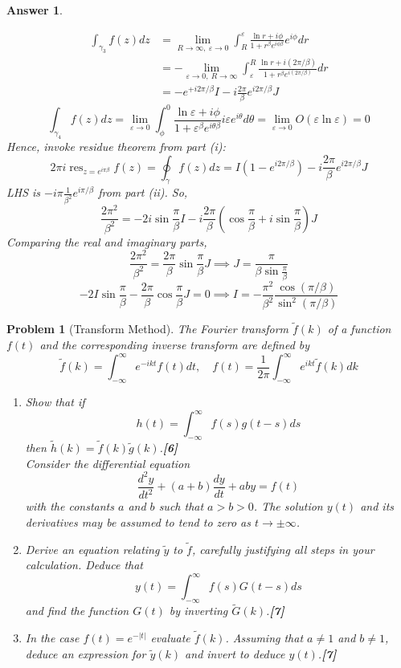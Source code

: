 \documentclass[a4paper]{article}
\DeclareMathOperator{\res}{res}
\newtheorem{ans}{Answer}[section]
\theoremstyle{new}
\newtheorem{qns}{Problem}[section]
\begin{document}
\begin{ans}
\begin{enumerate}[label=(\roman*)]
\begin{align}
\int_{\gamma_3}f(z)dz&=\lim_{R\rightarrow\infty,~\varepsilon\rightarrow 0}\int_R^\varepsilon\frac{\ln r+i\phi}{1+r^\beta e^{i\phi\beta}}e^{i\phi}dr\nonumber\\&=-\lim_{\varepsilon\rightarrow 0,~R\rightarrow\infty}\int_{\varepsilon}^R\frac{\ln r+i(2\pi/\beta)}{1+r^\beta e^{i(2\pi/\beta)}}dr\nonumber\\&=-e^{+i2\pi/\beta}I-i\frac{2\pi}{\beta}e^{i2\pi/\beta}J\nonumber
\end{align}
$$\int_{\gamma_4}f(z)dz=\lim_{\varepsilon\rightarrow 0}\int_\phi^0\frac{\ln\varepsilon+i\phi}{1+\varepsilon^\beta e^{i\theta\beta}}i\varepsilon e^{i\theta}d\theta=\lim_{\varepsilon\rightarrow 0}O(\varepsilon\ln\varepsilon)=0$$
Hence, invoke residue theorem from part (i):
$$2\pi i\res_{z=e^{i\pi\beta}}f(z)=\oint_\gamma f(z)dz=I(1-e^{i2\pi/\beta})-i\frac{2\pi}{\beta}e^{i2\pi/\beta}J$$
LHS is $-i\pi\frac{1}{\beta^2}e^{i\pi/\beta}$ from part (ii). So,
$$\frac{2\pi^2}{\beta^2}=-2i\sin\frac{\pi}{\beta}I-i\frac{2\pi}{\beta}(\cos\frac{\pi}{\beta}+i\sin\frac{\pi}{\beta})J$$
Comparing the real and imaginary parts,
$$\frac{2\pi^2}{\beta^2}=\frac{2\pi}{\beta}\sin\frac{\pi}{\beta}J\implies J=\frac{\pi}{\beta\sin\frac{\pi}{\beta}}$$
$$-2I\sin\frac{\pi}{\beta}-\frac{2\pi}{\beta}\cos\frac{\pi}{\beta}J=0\implies I=-\frac{\pi^2}{\beta^2}\frac{\cos(\pi/\beta)}{\sin^2(\pi/\beta)}$$
\end{enumerate}
\end{ans}
\newpage
\begin{qns}[Transform Method]
The Fourier transform $\tilde{f}(k)$ of a function $f(t)$ and the corresponding inverse transform are defined by
$$\tilde{f}(k)=\int_{-\infty}^\infty e^{-ikt}f(t)dt,\quad f(t)=\frac{1}{2\pi}\int_{-\infty}^\infty e^{ikt}\tilde{f}(k)dk$$
\begin{enumerate}[label=(\roman*)]
\item Show that if
$$h(t)=\int_{-\infty}^\infty f(s)g(t-s)ds$$
then $\tilde{h}(k)=\tilde{f}(k)\tilde{g}(k)$.\hfill\textbf{[6]}\\[5pt]
Consider the differential equation
$$\frac{d^2y}{dt^2}+(a+b)\frac{dy}{dt}+aby=f(t)$$
with the constants $a$ and $b$ such that $a > b > 0$. The solution $y(t)$ and its derivatives may be assumed to tend to zero as $t\rightarrow\pm\infty$.
\item Derive an equation relating $\tilde{y}$ to $\tilde{f}$, carefully justifying all steps in your calculation. Deduce that
$$y(t)=\int_{-\infty}^\infty f(s)G(t-s)ds$$
and find the function $G(t)$ by inverting $\tilde{G}(k)$.\hfill\textbf{[7]}
\item In the case $f(t) = e^{−|t|}$ evaluate $\tilde{f}(k)$. Assuming that $a\neq1$ and $b\neq1$, deduce an expression for $\tilde{y}(k)$ and invert to deduce $y(t)$.\hfill\textbf{[7]}
\end{enumerate}
\end{qns}
\end{document}
